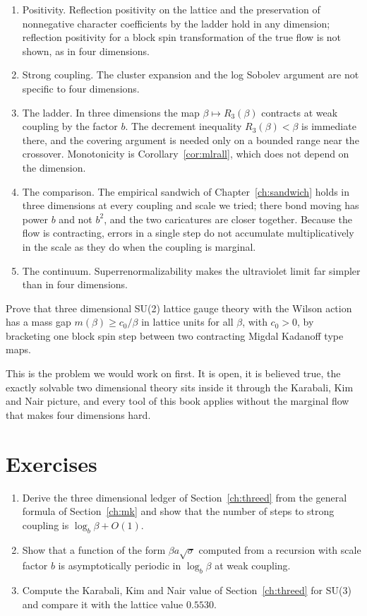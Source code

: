 \begin{enumerate}
\item[1.] Positivity. Reflection positivity on the lattice and the preservation of nonnegative character coefficients by the ladder hold in any dimension; reflection positivity for a block spin transformation of the true flow is not shown, as in four dimensions.
\item[2.] Strong coupling. The cluster expansion and the log Sobolev argument are not specific to four dimensions.
\item[3.] The ladder. In three dimensions the map $\beta\mapsto R_3(\beta)$ contracts at weak coupling by the factor $b$. The decrement inequality $R_3(\beta)<\beta$ is immediate there, and the covering argument is needed only on a bounded range near the crossover. Monotonicity is Corollary~\ref{cor:mlrall}, which does not depend on the dimension.
\item[4.] The comparison. The empirical sandwich of Chapter~\ref{ch:sandwich} holds in three dimensions at every coupling and scale we tried; there bond moving has power $b$ and not $b^2$, and the two caricatures are closer together. Because the flow is contracting, errors in a single step do not accumulate multiplicatively in the scale as they do when the coupling is marginal.
\item[5.] The continuum. Superrenormalizability makes the ultraviolet limit far simpler than in four dimensions.
\end{enumerate}

\begin{problem}\label{op:path7}
Prove that three dimensional SU(2) lattice gauge theory with the Wilson action has a mass gap $m(\beta)\ge c_0/\beta$ in lattice units for all $\beta$, with $c_0>0$, by bracketing one block spin step between two contracting Migdal Kadanoff type maps.
\end{problem}

This is the problem we would work on first. It is open, it is believed true, the exactly solvable two dimensional theory sits inside it through the Karabali, Kim and Nair picture, and every tool of this book applies without the marginal flow that makes four dimensions hard.

\section*{Exercises}
\begin{enumerate}
\item Derive the three dimensional ledger of Section~\ref{ch:threed} from the general formula of Section~\ref{ch:mk} and show that the number of steps to strong coupling is $\log_b\beta+O(1)$.
\item Show that a function of the form $\beta a\sqrt\sigma$ computed from a recursion with scale factor $b$ is asymptotically periodic in $\log_b\beta$ at weak coupling.
\item Compute the Karabali, Kim and Nair value of Section~\ref{ch:threed} for SU(3) and compare it with the lattice value $0.5530$.
\end{enumerate}
